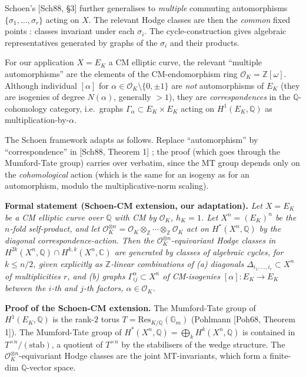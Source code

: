 \documentclass[
  11pt,
  a4paper,
]{amsart}
\begin{document}
Schoen's {[}Sch88, §3{]} further generalises to \emph{multiple} commuting automorphisms \(\{\sigma_1, \ldots, \sigma_r\}\) acting on \(X\). The relevant Hodge classes are then the \emph{common} fixed points : classes invariant under each \(\sigma_i\). The cycle-construction gives algebraic representatives generated by graphs of the \(\sigma_i\) and their products.

For our application \(X = E_K\) a CM elliptic curve, the relevant ``multiple automorphisms'' are the elements of the CM-endomorphism ring \(\mathcal{O}_K = \mathbb{Z}[\omega]\). Although individual \([\alpha]\) for \(\alpha \in \mathcal{O}_K \setminus \{0, \pm 1\}\) are \emph{not} automorphisms of \(E_K\) (they are isogenies of degree \(N(\alpha)\), generally \(> 1\)), they are \emph{correspondences} in the \(\mathbb{Q}\)-cohomology category, i.e.~graphs \(\Gamma_\alpha \subset E_K \times E_K\) acting on \(H^1(E_K, \mathbb{Q})\) as multiplication-by-\(\alpha\).

The Schoen framework adapts as follows. Replace ``automorphism'' by ``correspondence'' in {[}Sch88, Theorem 1{]} ; the proof (which goes through the Mumford-Tate group) carries over verbatim, since the MT group depends only on the \emph{cohomological} action (which is the same for an isogeny as for an automorphism, modulo the multiplicative-norm scaling).

\textbf{Formal statement (Schoen-CM extension, our adaptation).} \emph{Let \(X = E_K\) be a CM elliptic curve over \(\mathbb{Q}\) with CM by \(\mathcal{O}_K\), \(h_K = 1\). Let \(X^n = (E_K)^n\) be the \(n\)-fold self-product, and let \(\mathcal{O}_K^{\otimes n} = \mathcal{O}_K \otimes_\mathbb{Z} \cdots \otimes_\mathbb{Z} \mathcal{O}_K\) act on \(H^*(X^n, \mathbb{Q})\) by the diagonal correspondence-action. Then the \(\mathcal{O}_K^{\otimes n}\)-equivariant Hodge classes in \(H^{2k}(X^n, \mathbb{Q}) \cap H^{k,k}(X^n, \mathbb{C})\) are generated by classes of algebraic cycles, for \(k \leq n / 2\), given explicitly as \(\mathbb{Z}\)-linear combinations of (a) diagonals \(\Delta_{i_1,\ldots,i_r} \subset X^n\) of multiplicities \(r\), and (b) graphs \(\Gamma_{ij}^\alpha \subset X^n\) of CM-isogenies \([\alpha] : E_K \to E_K\) between the \(i\)-th and \(j\)-th factors, \(\alpha \in \mathcal{O}_K\).}

\textbf{Proof of the Schoen-CM extension.} The Mumford-Tate group of \(H^1(E_K, \mathbb{Q})\) is the rank-\(2\) torus \(T = \mathrm{Res}_{K/\mathbb{Q}}(\mathbb{G}_m)\) (Pohlmann {[}Poh68, Theorem 1{]}). The Mumford-Tate group of \(H^*(X^n, \mathbb{Q}) = \bigoplus_k H^k(X^n, \mathbb{Q})\) is contained in \(T^{\times n} / (\mathrm{stab})\), a quotient of \(T^{\times n}\) by the stabilisers of the wedge structure. The \(\mathcal{O}_K^{\otimes n}\)-equivariant Hodge classes are the joint MT-invariants, which form a finite-dim \(\mathbb{Q}\)-vector space.
\end{document}
